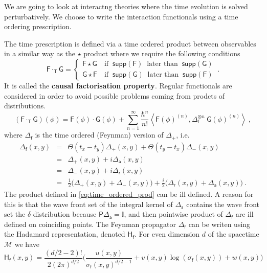 \documentclass[10pt]{book}
\newcommand{\supp}{\mathsf{supp}}
\newcommand{\sm}[1]{\left\langle#1\right\rangle}
\newcommand{\Mcal}{\mathcal{M}}
\newcommand{\Ibb}{\mathbb{I}}
\newcommand{\Fsf}{\mathsf{F}}
\newcommand{\Gsf}{\mathsf{G}}
\newcommand{\Hsf}{\mathsf{H}}
\newcommand{\Psf}{\mathsf{P}}
\newcommand{\Tsf}{\mathsf{T}}
\newcommand{\asf}{\mathsf{a}}
\newcommand{\fsf}{\mathsf{f}}
\newcommand{\rsf}{\mathsf{r}}
\theoremstyle{break}
\begin{document}
\bigskip


We are going to look at interactng theories where the time evolution is solved perturbatively. We choose to write the interaction functionals using a time ordering prescription. 


\bigskip


The time prescription is defined via a time ordered product between observables in a similar way as the $\star$ product where we require the following conditions
%
\begin{equation*}
\Fsf \cdot_\Tsf \Gsf = 
\left\{
\begin{array}{ll}
\Fsf \star \Gsf \quad \mbox{if } \ \supp(\Fsf) \ \mbox{ later than  } \ \supp(\Gsf)  \\
\Gsf \star \Fsf \quad \mbox{if } \ \supp(\Gsf) \ \mbox{ later than  } \ \supp(\Fsf) 
\end{array}
\right. \ .
\end{equation*}
%
It is called the \textbf{causal factorisation property}. Regular functionals are considered in order to avoid possible problems coming from prodcts of distributions.
%
\begin{equation}
(\Fsf \cdot_\Tsf  \Gsf)(\phi) = \Fsf(\phi) \cdot \Gsf(\phi) + \sum_{n=1}^\infty \frac{\hbar^n}{n!} \sm{ \Fsf(\phi)^{(n)} , \Delta_\fsf^{\otimes n} \ \Gsf(\phi)^{(n)} } \ ,
\label{eq:time_ordered_prod}
\end{equation}
%
where $\Delta_\fsf$ is the time ordered (Feynman) version of $\Delta_+$, i.e.
%
\begin{eqnarray*}
\Delta_\fsf(x,y) &=& \Theta(t_x-t_y) \Delta_+(x,y) + \Theta(t_y-t_x) \Delta_-(x,y) \\
&=& \Delta_+(x,y) + i \Delta_\asf(x,y) \\
&=& \Delta_-(x,y) + i \Delta_\rsf(x,y) \\
&=& \frac12 \bigg( \Delta_+(x,y) + \Delta_-(x,y) \bigg) + \frac{i}{2} \bigg(\Delta_\rsf(x,y) + \Delta_\asf(x,y) \bigg) \ .
\end{eqnarray*}
%
The product defined in \eqref{eq:time_ordered_prod} can be ill defined. A reason for
this is that the wave front set of the integral kernel of $\Delta_\asf$ contains the wave front set the $\delta$ distribution because $\Psf \Delta_\asf = \Ibb$, and then pointwise product of $\Delta_\fsf$ are ill defined on coinciding points. The Feynman propagator $\Delta_\fsf$ can be writen using the Hadamard representation, denoted $\Hsf_\fsf$. For even dimension $d$ of the spacetime $\Mcal$ we have
%
\begin{equation*}
\Hsf_\fsf(x,y) = \frac{(d/2-2)!}{2(2\pi)^{d/2}} \bigg( \frac{u(x,y)}{\sigma_\fsf(x,y)^{d/2-1}} + v(x,y) \log\left( \sigma_\fsf(x,y) \right) + w(x,y) \bigg) 
\end{equation*}
\end{document}
